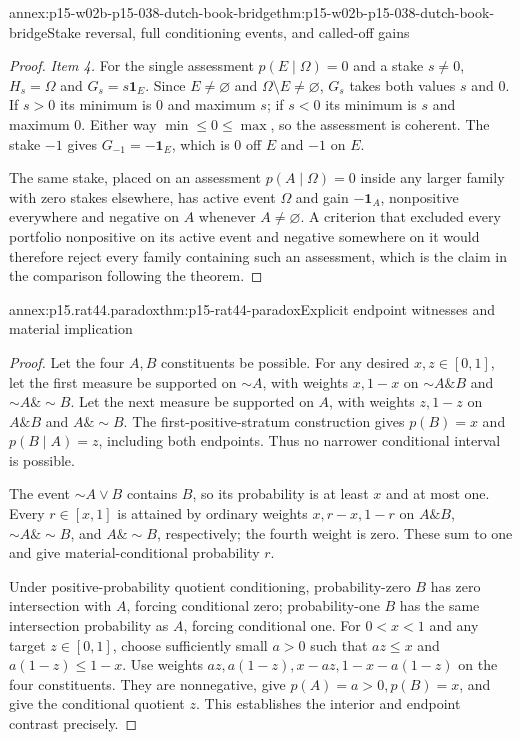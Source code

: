 \begin{annexitem}{annex:p15-w02b-p15-038-dutch-book-bridge}{thm:p15-w02b-p15-038-dutch-book-bridge}{Stake reversal, full conditioning events, and called-off gains}
\begin{proof}
\emph{Item 4.} For the single assessment \(p(E\mid\Omega)=0\) and a
stake \(s\ne0\), \(H_s=\Omega\) and \(G_s=s\mathbf1_E\). Since
\(E\ne\varnothing\) and \(\Omega\setminus E\ne\varnothing\), \(G_s\)
takes both values \(s\) and \(0\). If \(s>0\) its minimum is \(0\)
and maximum \(s\); if \(s<0\) its minimum is \(s\) and maximum \(0\).
Either way \(\min\leq0\leq\max\), so the assessment is coherent. The
stake \(-1\) gives \(G_{-1}=-\mathbf1_E\), which is \(0\) off \(E\) and
\(-1\) on \(E\).

The same stake, placed on an assessment \(p(A\mid\Omega)=0\) inside
any larger family with zero stakes elsewhere, has active event
\(\Omega\) and gain \(-\mathbf1_A\), nonpositive everywhere and
negative on \(A\) whenever \(A\ne\varnothing\). A criterion that
excluded every portfolio nonpositive on its active event and negative
somewhere on it would therefore reject every family containing such an
assessment, which is the claim in the comparison following the theorem.
\end{proof}
\end{annexitem}

\begin{annexitem}{annex:p15.rat44.paradox}{thm:p15-rat44-paradox}{Explicit endpoint witnesses and material implication}
\begin{proof}
Let the four \(A,B\) constituents be possible. For any desired
\(x,z\in[0,1]\), let the first measure be supported on \(\sim A\),
with weights \(x,1-x\) on \(\sim A\mathbin{\&}B\) and
\(\sim A\mathbin{\&}\sim B\). Let the next measure be supported
on \(A\), with weights \(z,1-z\) on
\(A\mathbin{\&}B\) and \(A\mathbin{\&}\sim B\).
The first-positive-stratum construction gives \(p(B)=x\) and
\(p(B\mid A)=z\), including both endpoints. Thus no narrower
conditional interval is possible.

The event \(\sim A\lor B\) contains \(B\), so its probability
is at least \(x\) and at most one. Every \(r\in[x,1]\) is
attained by ordinary weights \(x,r-x,1-r\) on
\(A\mathbin{\&}B\), \(\sim A\mathbin{\&}\sim B\), and
\(A\mathbin{\&}\sim B\), respectively; the fourth weight is zero.
These sum to one and give material-conditional probability \(r\).

Under positive-probability quotient conditioning, probability-zero
\(B\) has zero intersection with \(A\), forcing conditional zero;
probability-one \(B\) has the same intersection probability as
\(A\), forcing conditional one. For \(0<x<1\) and any target
\(z\in[0,1]\), choose sufficiently small \(a>0\) such that
\(az\leq x\) and \(a(1-z)\leq1-x\). Use weights
\(az,a(1-z),x-az,1-x-a(1-z)\) on the four constituents.
They are nonnegative, give \(p(A)=a>0,p(B)=x\), and give the
conditional quotient \(z\). This establishes the interior and
endpoint contrast precisely.
\end{proof}
\end{annexitem}

